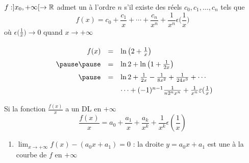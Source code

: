 \begin{frame}

$f : ]x_0,+\infty[ \to \mathbb{R}$ admet un  à l'ordre $n$
s'il existe des réels $c_0,c_1,\ldots,c_n$ tels que 
$$f(x)=c_0+\frac{c_1}{x}+\cdots+\frac{c_n}{x^n} 
+\frac{1}{x^n}\epsilon\big(\frac{1}{x}\big)$$
\pause
où $\epsilon\big(\frac{1}{x}\big) \to 0$ quand $x\to+\infty$

\pause
\medskip


\pause

\begin{exemple}
\hfill
\begin{minipage}{0.5\textwidth}
\end{minipage}

\vspace*{-33mm}
\begin{minipage}{0.5\textwidth}
$$
\begin{array}{rcl@{\vrule depth 1.2ex height 3ex width 0mm }}
f(x)
 & = & \ln\big(2+\frac{1}{x}\big) \\ \pause \pause
 & = & \ln2+\ln\big(1+\frac{1}{2x}\big) \\ \pause
 & = & \ln2+\frac{1}{2x}-\frac{1}{8x^2}+\frac{1}{24x^3}+\cdots \\
& & \cdots +(-1)^{n-1}\frac{1}{n2^nx^n} +\frac{1}{x^{n}}\epsilon(\frac{1}{x}) 
\end{array}$$
  
\end{minipage}


\end{exemple}

\end{frame}


\begin{frame}
\begin{proposition} 
Si la  fonction $\frac{f(x)}{x}$ a un DL en $+\infty$
\vspace*{-3mm}
$$\frac{f(x)}{x}= a_0 +\frac{a_1}{x}+\frac{a_k}{x^k}+\frac{1}{x^k}\epsilon(\frac{1}{x})$$
\vspace*{-7mm}
\pause
\begin{enumerate}
  \item $\lim_{x\to+\infty} f(x)-(a_0x+a_1) =0$ : la droite $y= a_0x+a_1$ est une  à la courbe de $f$ en
$+\infty$
\end{enumerate}
\end{proposition}
\pause
{}
\end{frame}

